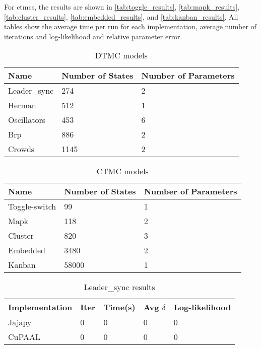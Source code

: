 For \glspl{ctmc}, the results are shown in \autoref{tab:toggle_results}, \autoref{tab:mapk_results}, \autoref{tab:cluster_results}, \autoref{tab:embedded_results}, and \autoref{tab:kanban_results}.
All tables show the average time per run for each implementation, average number of iterations and log-likelihood and relative parameter error.

\begin{table}[!htb]
    \centering
    \caption{DTMC models}
    \label{tab:dtmc_models}
    \begin{tabular}{lll}
        \toprule
        Name         & Number of States & Number of Parameters \\
        \midrule
        Leader\_sync & 274              & 2                    \\
        Herman       & 512              & 1                    \\
        Oscillators  & 453              & 6                    \\
        Brp          & 886              & 2                    \\
        Crowds       & 1145             & 2                    \\
        \bottomrule
    \end{tabular}
\end{table}

\begin{table}[!htb]
    \centering
    \caption{CTMC models}
    \label{tab:ctmc_models}
    \begin{tabular}{lll}
        \toprule
        Name          & Number of States & Number of Parameters \\
        \midrule
        Toggle-switch & 99               & 1                    \\
        Mapk          & 118              & 2                    \\
        Cluster       & 820              & 3                    \\
        Embedded      & 3480             & 2                    \\
        Kanban        & 58000            & 1                    \\
        \bottomrule
    \end{tabular}
\end{table}


\begin{table}[!htb]
    \centering
    \caption{Leader\_sync results}
    \label{tab:leader_results}
    \begin{tabular}{lllll}
        \toprule
        Implementation & Iter & Time(s) & Avg $\delta$ & Log-likelihood \\
        \midrule
        Jajapy         & 0    & 0       & 0            & 0              \\
        CuPAAL         & 0    & 0       & 0            & 0              \\
        \bottomrule
    \end{tabular}
\end{table}

